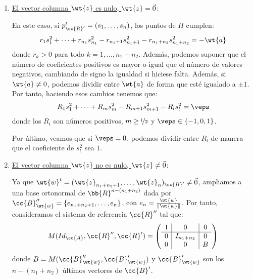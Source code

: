 \begin{enumerate}
    \item \ul{El vector columna $\wt{z}$ es nulo, $\wt{z}=\vec{0}$}:

    En este caso, si $p_{\cc{R}'}^t = (s_1,\dots,s_n)$, los puntos de $H$ cumplen:
    \begin{equation*}
        r_1s_1^2 + \dots + r_{n_1}s_{n_1}^2 - r_{n_1+1}s_{n_1+1}^2 - r_{n_1+n_2}s_{n_1+n_2}^2 = -\wt{a}
    \end{equation*}
    donde $r_k>0$ para todo $k=1,\dots,n_1+n_2$. Además, podemos suponer que el número de coeficientes positivos es mayor o igual que el número de valores negativos, cambiando de signo la igualdad si hiciese falta. Además, si $\wt{a}\neq 0$, podemos dividir entre $\wt{a}$ de forma que esté igualado a $\pm 1$. Por tanto, haciendo esos cambios tenemos que:
    \begin{equation*}
        R_1s_1^2 + \dots + R_{m}s_{m}^2 - R_{m+1}s_{m+1}^2 - R_{l}s_{l}^2 = \veps
    \end{equation*}
    donde los $R_i$ son números positivos, $m \geq \nicefrac{l}{2}$ y $\veps\in\{-1, 0, 1\}$.

    Por último, veamos que si $\veps=0$, podemos dividir entre $R_l$ de manera que el coeficiente de $s_l^2$ sea $1$.

    \item \ul{El vector columna $\wt{z}$ no es nulo, $\wt{z}\neq \vec{0}$}:

    Ya que $\wt{w}^t = (\wt{z}_{n_1+n_2+1},\dots, \wt{z}_{n})_{\cc{B}'}\neq \vec{0}$, ampliamos a una base ortonormal de $\bb{R}^{n-(n_1+n_2)}$ dada por $\cc{B}''_{\wt{w}}=\{e_{n_1+n_2+1}, \dots, e_n\}$, con $e_n = \frac{\wt{w}}{\|\wt{w}\|}$. Por tanto, consideramos el sistema de referencia $\cc{R}''$ tal que:
    \begin{equation*}
        M(Id_{\cc{A}}, \cc{R}'', \cc{R}') = \left(\begin{array}{c|c|c}
            1 & 0 & 0 \\ \hline
            0 & I_{n_1+n_2} & 0 \\
            0 & 0 & B
        \end{array}\right)
    \end{equation*}
    donde $B=M(\cc{B}''_{\wt{w}}, \cc{B}'_{\wt{w}})$ y $\cc{B}'_{\wt{w}}$ son los $n-(n_1+n_2)$ últimos vectores de $\cc{B}'$.


\end{enumerate}
